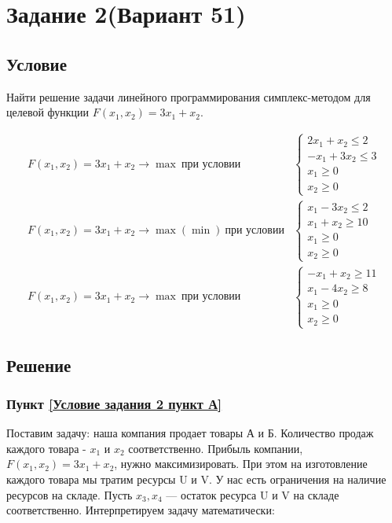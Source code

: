 \section{Задание 2(Вариант 51)}

\subsection{Условие}

Найти решение задачи линейного программирования симплекс-методом для целевой функции $F(x_1, x_2) = 3x_1 + x_2$.

\begin{align}
    F(x_1, x_2) = 3x_1 + x_2 \to \max\ \text{при условии} &
    \begin{cases}
        2x_1 + x_2 \leq 2\\
        -x_1 + 3x_2 \leq 3\\
        x_1 \geq 0\\
        x_2 \geq 0
    \end{cases}\tag{А}\label{Условие задания 2 пункт А}\\
    F(x_1, x_2) = 3x_1 + x_2 \to \max(\min)\ \text{при условии} &
    \begin{cases}
        x_1 - 3x_2 \leq 2 \\
        x_1 + x_2 \geq 10 \\
        x_1 \geq 0 \\
        x_2 \geq 0
    \end{cases}\tag{Б}\label{Условие задания 2 пункт Б}\\
    F(x_1, x_2) = 3x_1 + x_2 \to \max\ \text{при условии} &
    \begin{cases}
        -x_1 + x_2 \geq 11\\
        x_1 - 4x_2 \geq 8\\
        x_1 \geq 0\\
        x_2 \geq 0
    \end{cases}\tag{В}
    \label{Условие задания 2 пункт В}
\end{align}

\subsection{Решение}
\subsubsection{Пункт \ref{Условие задания 2 пункт А}}

Поставим задачу: наша компания продает товары А и Б. Количество продаж каждого товара - $x_1$ и $x_2$ соответственно.
Прибыль компании, $F(x_1, x_2) = 3x_1 + x_2$, нужно максимизировать. При этом на изготовление каждого товара мы тратим ресурсы U и V.
У нас есть ограничения на наличие ресурсов на складе. Пусть $x_3, x_4$ --- остаток ресурса U и V на складе соответственно.
Интерпретируем задачу математически:

